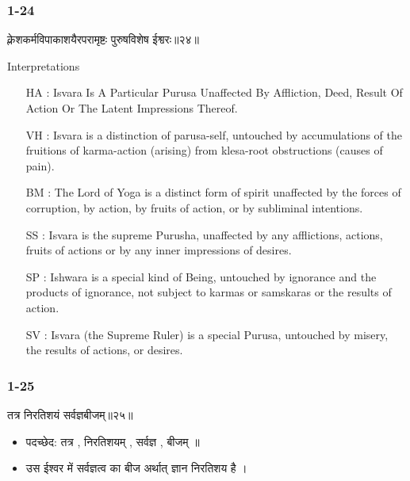 \begin{frame}[fragile]\frametitle{1-24}
\begin{sanskrit}
क्लेशकर्मविपाकाशयैरपरामृष्टः पुरुषविशेष ईश्वरः॥२४॥
\end{sanskrit}

Interpretations
\begin{itemize}		
\item [HA]: Isvara Is A Particular Purusa Unaffected By Affliction, Deed, Result Of Action Or The Latent Impressions Thereof.
\item [VH]: Isvara is a distinction of parusa-self, untouched by accumulations of the fruitions of karma-action (arising) from klesa-root obstructions (causes of pain).
\item [BM]: The Lord of Yoga is a distinct form of spirit unaffected by the forces of corruption, by action, by fruits of action, or by subliminal intentions.
\item [SS]: Isvara is the supreme Purusha, unaffected by any afflictions, actions, fruits of actions or by any inner impressions of desires.
\item [SP]: Ishwara is a special kind of Being, untouched by ignorance and the products of ignorance, not subject to karmas or samskaras or the results of action.
\item [SV]: Isvara (the Supreme Ruler) is a special Purusa, untouched by misery, the results of actions, or desires. 
\end{itemize}
	
\end{frame}

\begin{frame}[fragile]\frametitle{1-25}
\begin{sanskrit}
तत्र निरतिशयं सर्वज्ञबीजम्॥२५॥
\end{sanskrit}

	\begin{itemize}
	\item पदच्छेद: तत्र , निरतिशयम् , सर्वज्ञ , बीजम् ॥
	\item उस ईश्वर में सर्वज्ञत्व का बीज अर्थात् ज्ञान निरतिशय है ।
	\end{itemize}
	
\end{frame}

